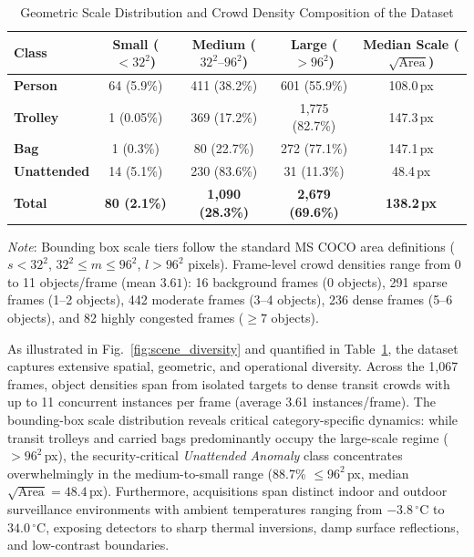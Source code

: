\documentclass[journal,twoside,web]{ieeecolor}
\begin{document}
\begin{table}[t]
\centering
\caption{Geometric Scale Distribution and Crowd Density Composition of the Dataset}
\label{tab:scene_composition}
\small
\setlength{\tabcolsep}{4pt}
\renewcommand{\arraystretch}{1.15}
\begin{tabular}{lcccc}
\toprule
\textbf{Class} & \textbf{Small ($<32^2$)} & \textbf{Medium ($32^2\text{--}96^2$)} & \textbf{Large ($>96^2$)} & \textbf{Median Scale ($\sqrt{\text{Area}}$)} \\
\midrule
\textbf{Person}     & 64 (5.9\%)   & 411 (38.2\%) & 601 (55.9\%)   & 108.0\,px \\
\textbf{Trolley}    & 1 (0.05\%)   & 369 (17.2\%) & 1{,}775 (82.7\%) & 147.3\,px \\
\textbf{Bag}        & 1 (0.3\%)    & 80 (22.7\%)  & 272 (77.1\%)   & 147.1\,px \\
\textbf{Unattended} & 14 (5.1\%)   & 230 (83.6\%) & 31 (11.3\%)    & 48.4\,px \\
\midrule
\textbf{Total}      & \textbf{80 (2.1\%)} & \textbf{1{,}090 (28.3\%)} & \textbf{2{,}679 (69.6\%)} & \textbf{138.2\,px} \\
\bottomrule
\end{tabular}
\vspace{1ex}
{\raggedright \footnotesize \textit{Note}: Bounding box scale tiers follow the standard MS COCO area definitions ($s < 32^2$, $32^2 \le m \le 96^2$, $l > 96^2$ pixels). Frame-level crowd densities range from 0 to 11 objects/frame (mean $3.61$): 16 background frames (0 objects), 291 sparse frames (1--2 objects), 442 moderate frames (3--4 objects), 236 dense frames (5--6 objects), and 82 highly congested frames ($\ge 7$ objects).\par}
\end{table}

As illustrated in Fig.~\ref{fig:scene_diversity} and quantified in Table~\ref{tab:scene_composition}, the dataset captures extensive spatial, geometric, and operational diversity. Across the 1,067 frames, object densities span from isolated targets to dense transit crowds with up to 11 concurrent instances per frame (average 3.61 instances/frame). The bounding-box scale distribution reveals critical category-specific dynamics: while transit trolleys and carried bags predominantly occupy the large-scale regime ($>96^2$\,px), the security-critical \textit{Unattended Anomaly} class concentrates overwhelmingly in the medium-to-small range (88.7\% $\le 96^2$\,px, median $\sqrt{\text{Area}} = 48.4$\,px). Furthermore, acquisitions span distinct indoor and outdoor surveillance environments with ambient temperatures ranging from $-3.8\,^{\circ}\text{C}$ to $34.0\,^{\circ}\text{C}$, exposing detectors to sharp thermal inversions, damp surface reflections, and low-contrast boundaries.
\end{document}
